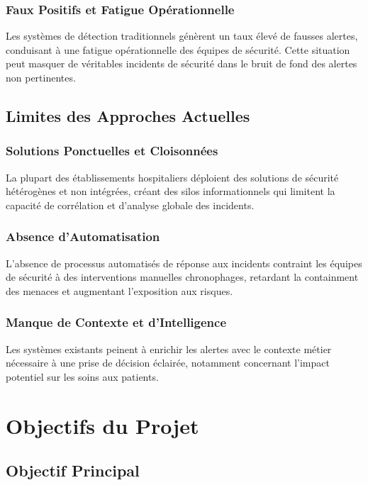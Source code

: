 \subsubsection{Faux Positifs et Fatigue Opérationnelle}

Les systèmes de détection traditionnels génèrent un taux élevé de fausses alertes, conduisant à une fatigue opérationnelle des équipes de sécurité. Cette situation peut masquer de véritables incidents de sécurité dans le bruit de fond des alertes non pertinentes.

\subsection{Limites des Approches Actuelles}

\subsubsection{Solutions Ponctuelles et Cloisonnées}

La plupart des établissements hospitaliers déploient des solutions de sécurité hétérogènes et non intégrées, créant des silos informationnels qui limitent la capacité de corrélation et d'analyse globale des incidents.

\subsubsection{Absence d'Automatisation}

L'absence de processus automatisés de réponse aux incidents contraint les équipes de sécurité à des interventions manuelles chronophages, retardant la containment des menaces et augmentant l'exposition aux risques.

\subsubsection{Manque de Contexte et d'Intelligence}

Les systèmes existants peinent à enrichir les alertes avec le contexte métier nécessaire à une prise de décision éclairée, notamment concernant l'impact potentiel sur les soins aux patients.

\section{Objectifs du Projet}

\subsection{Objectif Principal}

